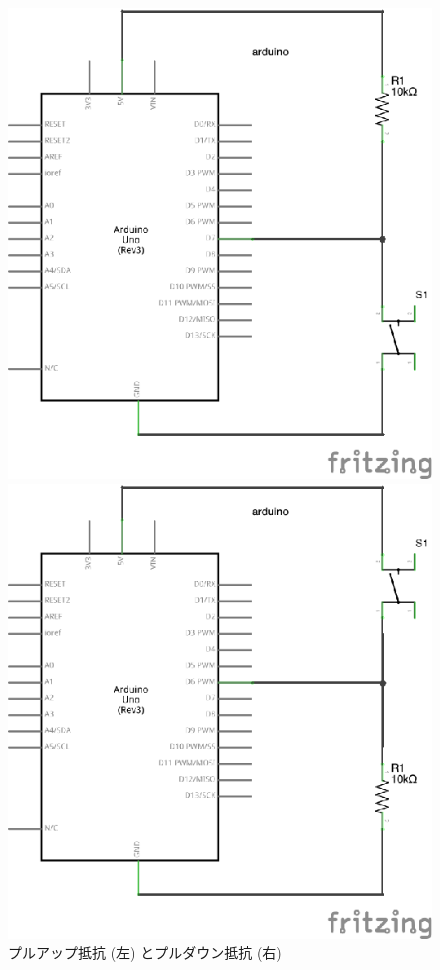 \documentclass[11pt,a4paper]{jarticle}
\begin{document}
\begin{figure}[h!]
 \begin{minipage}{0.5\columnwidth}
  \centering
  \includegraphics[width=0.7\columnwidth]{img/pullup.eps}
 \end{minipage}
 \begin{minipage}{0.5\columnwidth}
  \centering
  \includegraphics[width=0.7\columnwidth]{img/pulldown.eps}
 \end{minipage}
  \caption{プルアップ抵抗 (左) とプルダウン抵抗 (右)}
\end{figure}
\end{document}
